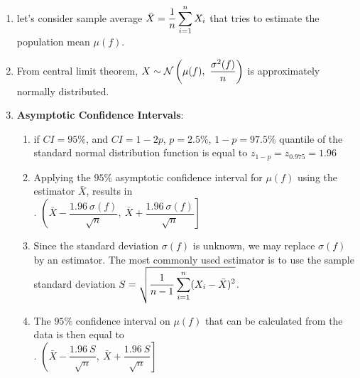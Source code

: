 \begin{enumerate}
    \item let’s consider sample average $\bar{X} = \dfrac{1}{n} \displaystyle\sum^n _{i=1} X_ i$ that tries to estimate the population mean $\mu( f )$.
    \hfill \cite{statistics/book/Statistics-for-Data-Scientists/Maurits-Kaptein}

    \item From central limit theorem, $X \sim \mathcal{N} \left(\mu( f ),\ \dfrac{\sigma^ 2( f )}{n}\right)$ is approximately normally distributed.
    \hfill \cite{statistics/book/Statistics-for-Data-Scientists/Maurits-Kaptein}

    \item \textbf{Asymptotic Confidence Intervals}:
    \begin{enumerate}
        \item if $CI = 95\%$, and $CI = 1-2p$, $p=2.5\%$, $1-p = 97.5\%$ quantile of the standard normal distribution function is equal to $z_{1-p} = z_{0.975} = 1.96$
        \hfill \cite{statistics/book/Statistics-for-Data-Scientists/Maurits-Kaptein}

        \item Applying the $95\%$ asymptotic confidence interval for $\mu( f )$ using the estimator $\bar{X}$, results in
        \hfill \cite{statistics/book/Statistics-for-Data-Scientists/Maurits-Kaptein}
        \\[0.2cm]
        .\hfill
        $
            \left ( \bar{X} - \dfrac{1.96\ \sigma ( f )}{\sqrt{n}},
            \ \bar{X} + \dfrac{1.96\ \sigma ( f )}{\sqrt{n}} \right ]
        $
        \hfill \cite{statistics/book/Statistics-for-Data-Scientists/Maurits-Kaptein}

        \item Since the standard deviation $\sigma ( f )$ is unknown, we may replace $\sigma ( f )$ by an estimator.
        The most commonly used estimator is to use the sample standard deviation
        $S = \sqrt{\dfrac{1}{n - 1} \displaystyle\sum^n _{i=1}(X_ i - \bar{X})^2}$.
        \hfill \cite{statistics/book/Statistics-for-Data-Scientists/Maurits-Kaptein}

        \item The $95\%$ confidence interval on $\mu( f )$ that can be calculated from the data is then equal to
        \hfill \cite{statistics/book/Statistics-for-Data-Scientists/Maurits-Kaptein}
        \\[0.2cm]
        .\hfill
        $
            \left ( \bar{X} - \dfrac{1.96\ S}{\sqrt{n}},
            \ \bar{X} + \dfrac{1.96\ S}{\sqrt{n}} \right ]
        $
        \hfill \cite{statistics/book/Statistics-for-Data-Scientists/Maurits-Kaptein}
    \end{enumerate}
\end{enumerate}









